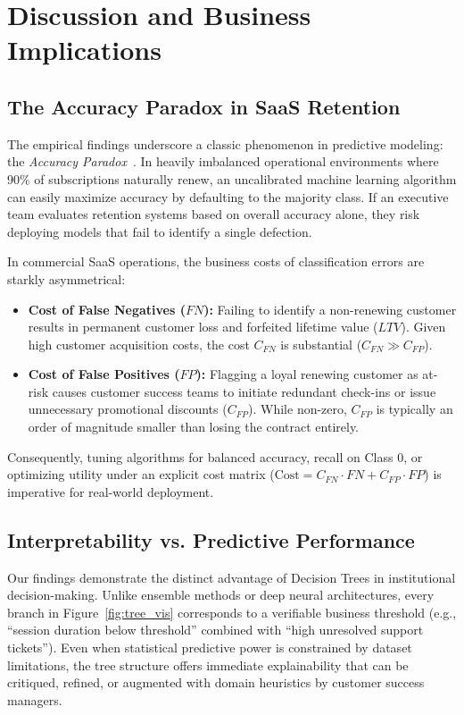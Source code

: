 \documentclass[pdflatex,sn-mathphys-num]{sn-jnl}
\begin{document}
\section{Discussion and Business Implications}\label{sec:discussion}

\subsection{The Accuracy Paradox in SaaS Retention}
The empirical findings underscore a classic phenomenon in predictive modeling: the \textit{Accuracy Paradox}~\cite{fawcett2006introduction}. In heavily imbalanced operational environments where 90\% of subscriptions naturally renew, an uncalibrated machine learning algorithm can easily maximize accuracy by defaulting to the majority class. If an executive team evaluates retention systems based on overall accuracy alone, they risk deploying models that fail to identify a single defection.

In commercial SaaS operations, the business costs of classification errors are starkly asymmetrical:
\begin{itemize}
    \item \textbf{Cost of False Negatives ($FN$):} Failing to identify a non-renewing customer results in permanent customer loss and forfeited lifetime value ($LTV$). Given high customer acquisition costs, the cost $C_{FN}$ is substantial ($C_{FN} \gg C_{FP}$).
    \item \textbf{Cost of False Positives ($FP$):} Flagging a loyal renewing customer as at-risk causes customer success teams to initiate redundant check-ins or issue unnecessary promotional discounts ($C_{FP}$). While non-zero, $C_{FP}$ is typically an order of magnitude smaller than losing the contract entirely.
\end{itemize}
Consequently, tuning algorithms for balanced accuracy, recall on Class 0, or optimizing utility under an explicit cost matrix ($\text{Cost} = C_{FN} \cdot FN + C_{FP} \cdot FP$) is imperative for real-world deployment.

\subsection{Interpretability vs. Predictive Performance}
Our findings demonstrate the distinct advantage of Decision Trees in institutional decision-making. Unlike ensemble methods or deep neural architectures, every branch in Figure~\ref{fig:tree_vis} corresponds to a verifiable business threshold (e.g., ``session duration below threshold'' combined with ``high unresolved support tickets''). Even when statistical predictive power is constrained by dataset limitations, the tree structure offers immediate explainability that can be critiqued, refined, or augmented with domain heuristics by customer success managers.
\end{document}
